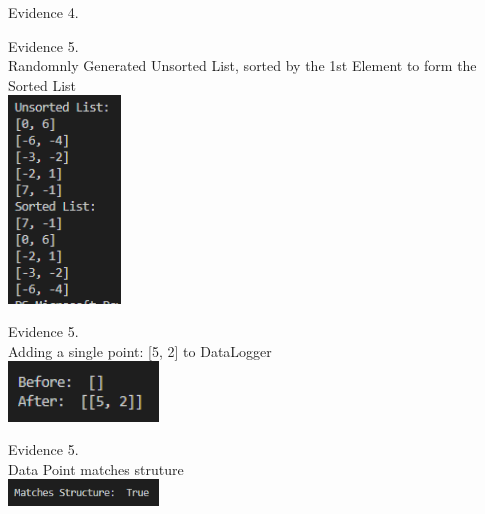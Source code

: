 \begin{flushleft}
    \setcounter{magicrownumbers}{0}
    \begin{center}
        {\large Evidence 4.\rn } \\ 
        \vspace{0.3cm}

    \end{center}

    \setcounter{magicrownumbers}{0}
    \begin{center}
        {\large Evidence 5.\rn } \\ 
        \vspace{0.3cm}
        Randomnly Generated Unsorted List, sorted by the 1st Element to form the Sorted List \\
        \includegraphics[width=3cm]{Images/Testing/T4.1.1.PNG} \\
        \vspace{1cm}

        {\large Evidence 5.\rn } \\ 
        \vspace{0.3cm}
        Adding a single point: [5, 2] to DataLogger \\
        \includegraphics[width=4cm]{Images/Testing/T4.2.1.PNG} \\
        \vspace{1cm}

        {\large Evidence 5.\rn } \\ 
        \vspace{0.3cm}
        Data Point matches struture \\
        \includegraphics[width=4cm]{Images/Testing/T4.3.1.PNG} \\
        \vspace{1cm}


\end{center}
\end{flushleft}
